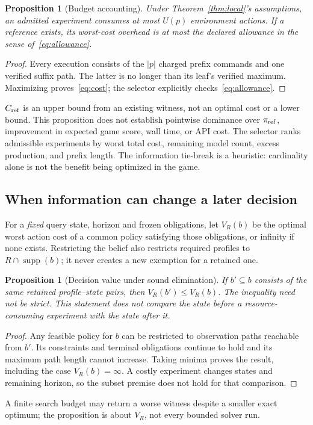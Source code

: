 \documentclass[11pt]{article}
\newtheorem{proposition}[theorem]{Proposition}
\theoremstyle{definition}
\newcommand{\supp}{\operatorname{supp}}
\begin{document}
\begin{proposition}[Budget accounting]\label{prop:budget}
Under Theorem~\ref{thm:local}'s assumptions, an admitted experiment consumes at
most $U(p)$ environment actions. If a reference exists, its worst-cost overhead
is at most the declared allowance in the sense of~\eqref{eq:allowance}.
\end{proposition}
\begin{proof}
Every execution consists of the $|p|$ charged prefix commands and one verified
suffix path. The latter is no longer than its leaf's verified maximum. Maximizing
proves~\eqref{eq:cost}; the selector explicitly checks~\eqref{eq:allowance}.
\end{proof}
$C_{\rm ref}$ is an upper bound from an existing witness, not an optimal cost or
a lower bound. This proposition does not establish pointwise dominance over
$\pi_{\rm ref}$, improvement in expected game score, wall time, or API cost.
The selector ranks admissible experiments by worst total cost, remaining model
count, excess production, and prefix length. The information tie-break is a
heuristic: cardinality alone is not the benefit being optimized in the game.

\subsection{When information can change a later decision}
For a \emph{fixed} query state, horizon and frozen obligations, let $V_R(b)$ be
the optimal worst action cost of a common policy satisfying those obligations,
or infinity if none exists. Restricting the belief also restricts required
profiles to $R\cap\supp(b)$; it never creates a new exemption for a retained one.

\begin{proposition}[Decision value under sound elimination]\label{prop:monotone}
If $b'\subseteq b$ consists of the same retained profile--state pairs, then
$V_R(b')\leq V_R(b)$. The inequality need not be strict. This statement does not
compare the state before a resource-consuming experiment with the state after it.
\end{proposition}
\begin{proof}
Any feasible policy for $b$ can be restricted to observation paths reachable from
$b'$. Its constraints and terminal obligations continue to hold and its maximum
path length cannot increase. Taking minima proves the result, including the
case $V_R(b)=\infty$. A costly experiment changes states and remaining horizon,
so the subset premise does not hold for that comparison.
\end{proof}
A finite search budget may return a worse witness despite a smaller exact
optimum; the proposition is about $V_R$, not every bounded solver run.
\end{document}
